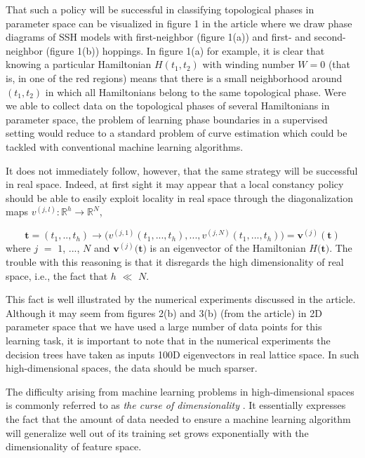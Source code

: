 \documentclass[10pt]{revtex4-1}
\begin{document}
That such a policy will be successful in classifying topological phases in parameter space can be visualized in figure 1 in the article %
where we draw phase diagrams of SSH models with first-neighbor (figure 1(a)) and first- and second-neighbor (figure 1(b)) hoppings. In figure 1(a) for example, it is clear that knowing a particular Hamiltonian $H(t_1,t_2)$ with winding number $W = 0$ (that is, in one of the red regions) means that there is a small neighborhood around $(t_1,t_2)$ in which all Hamiltonians  belong to the same topological phase. Were we able to collect data on the topological phases of several Hamiltonians in parameter space, the problem of learning phase boundaries in a supervised setting would reduce to a standard problem of curve estimation which could be tackled with conventional machine learning algorithms.

It does not immediately follow, however, that the same strategy will be successful in real space. Indeed, at first sight it may appear that a local constancy policy should be able to easily exploit locality in real space through the diagonalization maps $v^{(j,l)}: \mathbb{R}^h \rightarrow \mathbb{R}^{N}$,

\begin{equation}
\label{parameter_to_real}
\mathbf{t} = (t_1,..,t_h) \rightarrow \Big(v^{(j,1)}(t_1,...,t_h),...,v^{(j,N)}(t_1,...,t_h)\Big) = \mathbf{v}^{(j)}(\mathbf{t}) 
\end{equation}
where $j$ $=$ $1$, ..., $N$ and $\mathbf{v}^{(j)}$$($$\mathbf{t}$$)$ is an eigenvector of the Hamiltonian $H$$($$\mathbf{t}$$)$. The trouble with this reasoning is that it disregards the high dimensionality of real space, i.e., the fact that $h$ $\ll$ $N$.

This fact is well illustrated by the numerical experiments discussed in the article. Although it may seem from figures 2(b) and 3(b) (from the article) in 2D parameter space that we have used a large number of data points for this learning task, it is important to note that in the numerical experiments the decision trees have taken as inputs 100D eigenvectors in real lattice space. In such high-dimensional spaces, the data should be much sparser.

The difficulty arising from machine learning problems in high-dimensional spaces is commonly referred to as \emph{the curse of dimensionality} \cite{bishop2006pattern}. It essentially expresses the fact that the amount of data needed to ensure a machine learning algorithm will generalize well out of its training set grows exponentially with the dimensionality of feature space.
\end{document}
